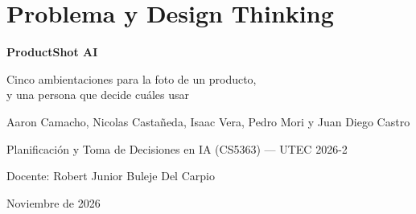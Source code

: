 \section{Problema y Design Thinking}
\begin{frame}
  \vspace{5mm}
  {\LARGE\color{colAcento}\bfseries ProductShot AI\par}
  \vspace{3mm}
  {\large\color{colAcento}Cinco ambientaciones para la foto de un producto,\\y una persona que decide cuáles usar\par}
  \vspace{8mm}
  Aaron Camacho, Nicolas Castañeda, Isaac Vera, Pedro Mori y Juan Diego Castro\par
  Planificación y Toma de Decisiones en IA (CS5363) --- UTEC 2026-2\par
  Docente: Robert Junior Buleje Del Carpio\par
  Noviembre de 2026
\end{frame}


